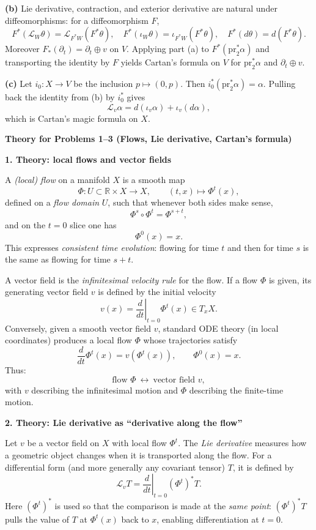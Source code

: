 \documentclass[12pt,a4paper]{article}
\theoremstyle{plain}
\theoremstyle{definition}      %
\begin{document}
\textbf{(b)} Lie derivative, contraction, and exterior derivative are natural under diffeomorphisms:
for a diffeomorphism $F$,
\[
F^*(\mathcal L_W\theta)=\mathcal L_{F^*W}(F^*\theta),\quad
F^*(\iota_W\theta)=\iota_{F^*W}(F^*\theta),\quad
F^*(d\theta)=d(F^*\theta).
\]
Moreover $F_*(\partial_t)=\partial_t\oplus v$ on $V$.
Applying part (a) to $F^*(\mathrm{pr}_2^*\alpha)$ and transporting the identity by $F$
yields Cartan's formula on $V$ for $\mathrm{pr}_2^*\alpha$ and $\partial_t\oplus v$.

\textbf{(c)} Let $i_0:X\to V$ be the inclusion $p\mapsto(0,p)$. Then $i_0^*(\mathrm{pr}_2^*\alpha)=\alpha$.
Pulling back the identity from (b) by $i_0^*$ gives
\[
\mathcal L_v\alpha = d(\iota_v\alpha)+\iota_v(d\alpha),
\]
which is Cartan's magic formula on $X$.

\textbf{Theory for Problems 1--3 (Flows, Lie derivative, Cartan's formula)}

\bigskip
\textbf{1. Theory: local flows and vector fields}

A \emph{(local) flow} on a manifold $X$ is a smooth map
\[
\Phi:U\subset \mathbb{R}\times X \to X,\qquad (t,x)\mapsto \Phi^t(x),
\]
defined on a \emph{flow domain} $U$, such that whenever both sides make sense,
\[
\Phi^{s}\circ \Phi^{t}=\Phi^{s+t},
\]
and on the $t=0$ slice one has
\[
\Phi^0(x)=x.
\]
This expresses \emph{consistent time evolution}: flowing for time $t$ and then for time $s$ is the same as flowing for time $s+t$.

A vector field is the \emph{infinitesimal velocity rule} for the flow. If a flow $\Phi$ is given, its generating vector field $v$ is defined by the initial velocity
\[
v(x)=\left.\frac{d}{dt}\right|_{t=0}\Phi^t(x)\in T_xX.
\]
Conversely, given a smooth vector field $v$, standard ODE theory (in local coordinates) produces a local flow $\Phi$ whose trajectories satisfy
\[
\frac{d}{dt}\Phi^t(x)=v(\Phi^t(x)),\qquad \Phi^0(x)=x.
\]
Thus:
\[
\text{flow } \Phi \ \longleftrightarrow\ \text{vector field } v,
\]
with $v$ describing the infinitesimal motion and $\Phi$ describing the finite-time motion.

\bigskip
\textbf{2. Theory: Lie derivative as ``derivative along the flow''}

Let $v$ be a vector field on $X$ with local flow $\Phi^t$. The \emph{Lie derivative} measures how a geometric object changes when it is transported along the flow. For a differential form (and more generally any covariant tensor) $T$, it is defined by
\[
\mathcal{L}_v T
=
\left.\frac{d}{dt}\right|_{t=0}(\Phi^t)^*T.
\]
Here $(\Phi^t)^*$ is used so that the comparison is made at the \emph{same point}: $(\Phi^t)^*T$ pulls the value of $T$ at $\Phi^t(x)$ back to $x$, enabling differentiation at $t=0$.
\end{document}
